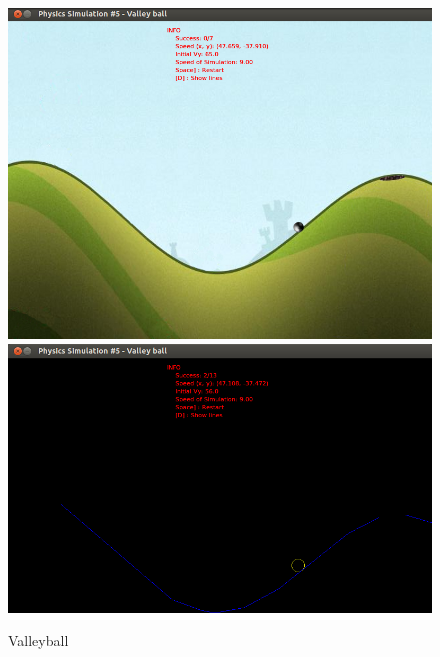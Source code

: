 \begin{figure}[H]
\centering
\caption{Valleyball}
  \includegraphics[scale=0.4]{images/valleyball.png}
  \includegraphics[scale=0.4]{images/valleyballE.png}
\end{figure}

